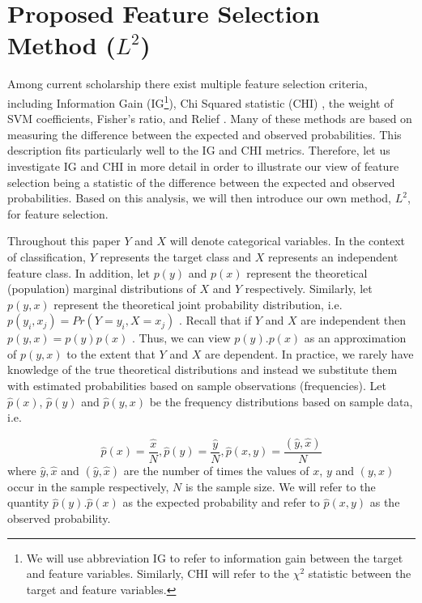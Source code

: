 \documentclass[review]{elsarticle}
\begin{document}
\section{Proposed Feature Selection Method ($ L^2 $)}

Among current scholarship there exist multiple feature selection criteria, including Information Gain (IG\footnote{We will use abbreviation IG to refer to information gain between the target and feature variables. Similarly, CHI will refer to the $ \ensuremath{\chi}^2 $ statistic between the target and feature variables.}), Chi Squared statistic (CHI) \cite{Quinlan1986, Liu1995} , the  weight of SVM coefficients, Fisher’s ratio, and Relief \cite{Hegde2014}. Many of these methods are based on measuring the difference between the expected and observed probabilities. This description fits particularly well to the IG and CHI metrics. Therefore, let us investigate IG and CHI in more detail in order to illustrate our view of feature selection being a statistic of the difference between the expected and observed probabilities. Based on this analysis, we will then introduce our own method, $ L^2 $, for feature selection.

Throughout this paper $ Y $ and $ X $ will denote categorical variables. In the context of classification, $ Y $ represents the target class and $ X $ represents an independent feature class. In addition, let $ p(y) $  and $ p(x) $  represent the theoretical (population) marginal distributions of $ X $ and  $ Y $ respectively. Similarly, let $ p(y,x) $  represent the theoretical joint probability distribution, i.e. $ p(y_{i},x_{j}) = Pr(Y = y_{i}, X = x_{j})$ . Recall that if $ Y $ and $ X $ are independent then $ p(y, x) = p(y) p(x) $ . Thus, we can view $ p(y). p(x) $ as an approximation of $ p(y, x) $  to the extent that $ Y $ and $ X $ are dependent. In practice, we rarely have knowledge of the true theoretical distributions and instead we substitute them with estimated probabilities based on sample observations (frequencies). Let $ \hat{p}(x) $, $ \hat{p}(y) $ and $ \hat{p}(y,x) $ be the frequency distributions based on sample data, i.e.

\[ 
 \hat{p}(x) = \frac{\hat{x}}{N} ,  \hat{p}(y) = \frac{\hat{y}}{N} ,  \hat{p}(x,y)= \frac {(\hat{y}, \hat{x})}{ N}
 \]
 where $ \hat{y}, \hat{x} $ and $ (\hat{y}, \hat{x}) $ are the number of times the values of $ x $, $ y $ and $ (y, x) $ occur in the sample respectively, $ N $ is the sample size. We will refer to the quantity $ \hat{p}(y).\hat{p}(x) $ as the expected probability and refer to $ \hat{p}(x,y) $ as the observed probability.
\end{document}

